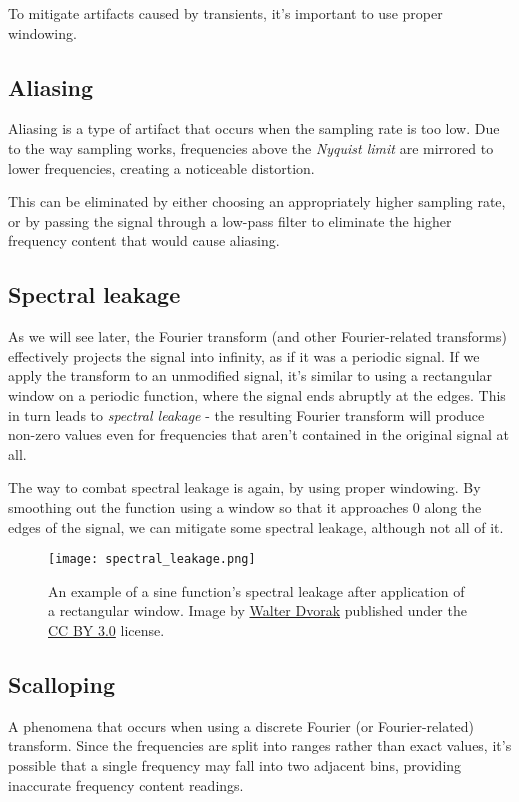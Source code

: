 To mitigate artifacts caused by transients, it's important to use proper windowing.

\subsection{Aliasing}
Aliasing is a type of artifact that occurs when the sampling rate is too low. Due to the way sampling works, frequencies above the \emph{Nyquist limit} are mirrored to lower frequencies, creating a noticeable distortion. \cite{bosi_goldberg_2003}

This can be eliminated by either choosing an appropriately higher sampling rate, or by passing the signal through a low-pass filter to eliminate the higher frequency content that would cause aliasing.

\subsection{Spectral leakage}
As we will see later, the Fourier transform (and other Fourier-related transforms) effectively projects the signal into infinity, as if it was a periodic signal. If we apply the transform to an unmodified signal, it's similar to using a rectangular window on a periodic function, where the signal ends abruptly at the edges. This in turn leads to \emph{spectral leakage} - the resulting Fourier transform will produce non-zero values even for frequencies that aren't contained in the original signal at all.

The way to combat spectral leakage is again, by using proper windowing. By smoothing out the function using a window so that it approaches $0$ along the edges of the signal, we can mitigate some spectral leakage, although not all of it.

\begin{figure}[ht]
	\caption[Spectral leakage example]{An example of a sine function's spectral leakage after application of a rectangular window. Image by \href{https://commons.wikimedia.org/wiki/User:Wdwd}{Walter Dvorak} published under the \href{https://creativecommons.org/licenses/by/3.0/deed.en}{CC BY 3.0} license.}
	\centering
	\texttt{[image: spectral\_leakage.png]}
\end{figure}

\subsection{Scalloping}
A phenomena that occurs when using a discrete Fourier (or Fourier-related) transform. Since the frequencies are split into ranges rather than exact values, it's possible that a single frequency may fall into two adjacent bins, providing inaccurate frequency content readings.

